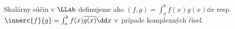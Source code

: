%    
%    
%
\begin{definicia}
    Skalárny súčin v $\LLab$ definujeme ako
    $(f,g) = \int_a^b f(x) g(x) \dd x$ resp. 
    $\innerc{f}{g} = \int_a^b f(x) \overline{g(x)} \dd x$ v~prípade
    komplexných čísel.
    \label{def:llab_inner_product}
\end{definicia}
